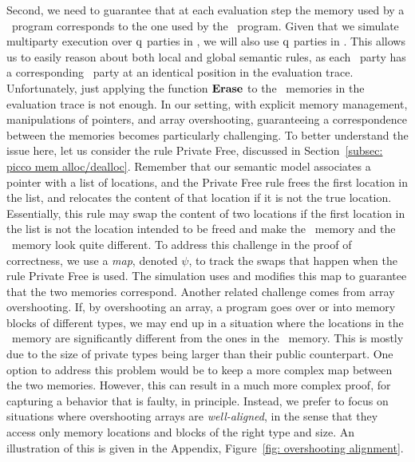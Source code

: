 Second, we need to guarantee that at each evaluation step the memory
used by a \piccoC\ program corresponds to the one used by the
\vanillaC\ program. 
Given that we simulate multiparty execution over $\mathrm{{q}}$ parties in \piccoC, we will also use $\mathrm{{q}}$ parties in \vanillaC. This allows us to easily reason about both local and global semantic rules, as each \piccoC\ party has a corresponding \vanillaC\ party at an identical position in the evaluation trace.
Unfortunately, just applying the function $\bm{\mathrm{Erase}}$ to the \piccoC\ memories in the evaluation trace is not enough. 
%
In our setting, with
explicit memory management, manipulations of pointers, and array overshooting, guaranteeing a correspondence between the memories becomes particularly
challenging. To better understand the issue here, let us consider
the rule Private Free, discussed in
Section~\ref{subsec: picco mem alloc/dealloc}. 
Remember that our semantic model associates a pointer
with a list of locations, and the Private Free rule frees the
first location in the list, and relocates the content of that location
if it is not the true location. 
Essentially, this rule may swap the content of two locations if the first location
in the list is not the location intended to be freed and 
make the \piccoC\ memory and the \vanillaC\ memory look quite
different. To address this challenge in the proof of correctness, we use a \emph{map}, denoted $\psi$,
to track the swaps that happen when the rule
Private Free is used. The simulation uses and modifies this map to
guarantee that the two memories correspond.
%
Another related challenge comes from array overshooting. If, by
overshooting an array, a program goes over or into memory blocks of
different types, we may end up in a situation where the locations in
the \piccoC\ memory are significantly different from the ones in the
\vanillaC\ memory. This is mostly due to the size of private types
being larger than their public counterpart. One option to address this
problem would be to keep a more complex map between the two
memories. However, this can result in a much more complex proof, for
capturing a behavior that is faulty, in principle. Instead, we prefer
to focus on situations where overshooting arrays are \emph{well-aligned}, in the sense that they access only memory locations and blocks of the right type and size. 
An illustration of this is given in the Appendix, Figure~\ref{fig: overshooting alignment}. 

